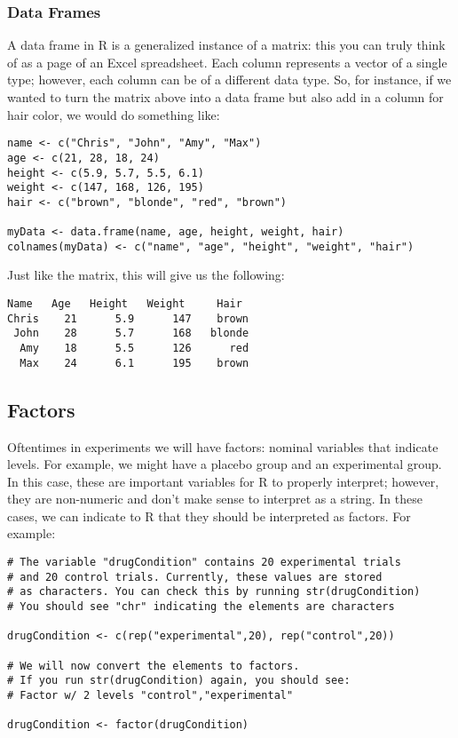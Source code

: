 \subsubsection{Data Frames}
A data frame in R is a generalized instance of a matrix: this you can truly think of as a page of an Excel spreadsheet. Each column represents a vector of a single type; however, each column can be of a different data type. So, for instance, if we wanted to turn the matrix above into a data frame but also add in a column for hair color, we would do something like:

\begin{framed}
\begin{Verbatim}[samepage=TRUE]
name <- c("Chris", "John", "Amy", "Max")
age <- c(21, 28, 18, 24)
height <- c(5.9, 5.7, 5.5, 6.1)
weight <- c(147, 168, 126, 195)
hair <- c("brown", "blonde", "red", "brown")
 
myData <- data.frame(name, age, height, weight, hair)
colnames(myData) <- c("name", "age", "height", "weight", "hair")
\end{Verbatim}
\end{framed}

Just like the matrix, this will give us the following:

\begin{framed}
\begin{Verbatim}[samepage=TRUE]
 Name   Age   Height   Weight     Hair
Chris    21      5.9      147    brown
 John    28      5.7      168   blonde
  Amy    18      5.5      126      red
  Max    24      6.1      195    brown
\end{Verbatim}
\end{framed}

\subsection{Factors}
Oftentimes in experiments we will have factors: nominal variables that indicate levels. For example, we might have a placebo group and an experimental group. In this case, these are important variables for R to properly interpret; however, they are non-numeric and don't make sense to interpret as a string. In these cases, we can indicate to R that they should be interpreted as factors. For example:

\begin{framed}
\begin{Verbatim}[samepage=TRUE]
# The variable "drugCondition" contains 20 experimental trials
# and 20 control trials. Currently, these values are stored
# as characters. You can check this by running str(drugCondition)
# You should see "chr" indicating the elements are characters
 
drugCondition <- c(rep("experimental",20), rep("control",20))
 
# We will now convert the elements to factors.
# If you run str(drugCondition) again, you should see:
# Factor w/ 2 levels "control","experimental"
 
drugCondition <- factor(drugCondition)
\end{Verbatim}
\end{framed}


